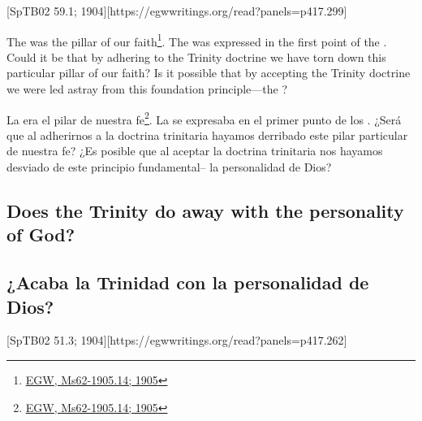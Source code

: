 [SpTB02 59.1; 1904][https://egwwritings.org/read?panels=p417.299]


The  was the pillar of our faith\footnote{\href{https://egwwritings.org/?ref=en_Ms62-1905.14}{EGW, Ms62-1905.14; 1905}}. The  was expressed in the first point of the . Could it be that by adhering to the Trinity doctrine we have torn down this particular pillar of our faith? Is it possible that by accepting the Trinity doctrine we were led astray from this foundation principle—the ?


La  era el pilar de nuestra fe\footnote{\href{https://egwwritings.org/?ref=en_Ms62-1905.14}{EGW, Ms62-1905.14; 1905}}. La  se expresaba en el primer punto de los . ¿Será que al adherirnos a la doctrina trinitaria hayamos derribado este pilar particular de nuestra fe? ¿Es posible que al aceptar la doctrina trinitaria nos hayamos desviado de este principio fundamental–  la personalidad de Dios?


\subsection*{Does the Trinity do away with the personality of God?}


\subsection*{¿Acaba la Trinidad con la personalidad de Dios?}


[SpTB02 51.3; 1904][https://egwwritings.org/read?panels=p417.262]



